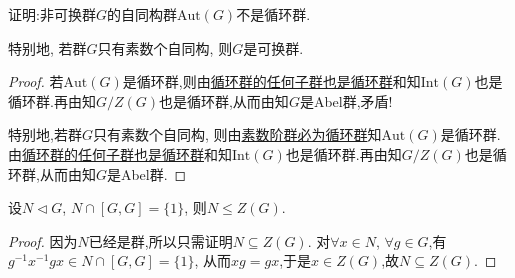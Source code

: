 \documentclass[../../main.tex]{subfiles}%
\begin{document}
\begin{example}
证明:非可换群$G$的自同构群$\mathrm{Aut}(G)$不是循环群. 

特别地, 若群$G$只有素数个自同构, 则$G$是可换群.
\end{example}
\begin{proof}

若$\mathrm{Aut}(G)$是循环群,则由\hyperref[theorem:循环群的任何子群也是循环群]{循环群的任何子群也是循环群}和知$\mathrm{Int}(G)$也是循环群.再由知$G/Z(G)$也是循环群,从而由知$G$是Abel群,矛盾!

特别地,若群$G$只有素数个自同构, 则由\hyperref[proposition:素数阶群必为循环群]{素数阶群必为循环群}知$\mathrm{Aut}(G)$是循环群.由\hyperref[theorem:循环群的任何子群也是循环群]{循环群的任何子群也是循环群}和知$\mathrm{Int}(G)$也是循环群.再由知$G/Z(G)$也是循环群,从而由知$G$是Abel群.

\end{proof}

\begin{example}
设$N \lhd G$, $N \cap [G,G] = \{1\}$, 则$N \leqslant Z(G)$.
\end{example}
\begin{proof}

因为$N$已经是群,所以只需证明$N\subseteq Z(G)$.
对$\forall x \in N$, $\forall g \in G$,有$g^{-1}x^{-1}gx \in N \cap [G,G] = \{1\}$, 从而$xg=gx$,于是$x \in Z(G)$,故$N\subseteq Z(G)$.

\end{proof}
\end{document}
